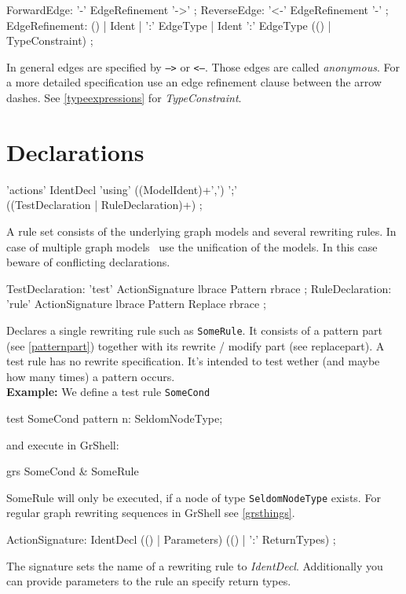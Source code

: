\begin{rail}
  ForwardEdge: '-' EdgeRefinement '->' ;
  ReverseEdge: '<-' EdgeRefinement '-' ;  
  EdgeRefinement: () | Ident | ':' EdgeType | Ident ':' EdgeType (() | TypeConstraint) ;
\end{rail}
In general edges are specified by \texttt{-->} or \texttt{<--}. Those edges are called \emph{anonymous}. For a more detailed specification use an edge refinement clause between the arrow dashes. See \ref{typeexpressions} for \emph{TypeConstraint}.

\section{Declarations}
\label{ruledecls}
\begin{rail}
  'actions' IdentDecl 'using' ((ModelIdent)+',') ';' \\ ((TestDeclaration | RuleDeclaration)+) ;
\end{rail}
A rule set consists of the underlying graph models and several rewriting rules. In case of multiple graph models \GrG\ use the unification of the models. In this case beware of conflicting declarations.

\begin{rail}
  TestDeclaration: 'test' ActionSignature lbrace Pattern rbrace ;
  RuleDeclaration: 'rule' ActionSignature lbrace Pattern Replace rbrace ;
\end{rail}
Declares a single rewriting rule such as \texttt{SomeRule}. It consists of a pattern part (see \ref{patternpart}) together with its rewrite / modify part (see {replacepart}). A test rule has no rewrite specification. It's intended to test wether (and maybe how many times) a pattern occurs.\\
{\small \textbf{Example:} We define a test rule \texttt{SomeCond}}
\begin{grgen}
test SomeCond {
  pattern {
    n: SeldomNodeType;
  }
}
\end{grgen}
{\small and execute in GrShell:}
\begin{grshell}
  grs SomeCond & SomeRule
\end{grshell}
{\small SomeRule will only be executed, if a node of type \texttt{SeldomNodeType} exists. For regular graph rewriting sequences in GrShell see \ref{grsthings}.}

\begin{rail}  
  ActionSignature: IdentDecl (() | Parameters) (() | ':' ReturnTypes) ;
\end{rail}
The signature sets the name of a rewriting rule to \emph{IdentDecl}. Additionally you can provide parameters to the rule an specify return types.

